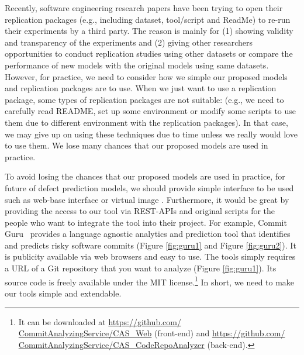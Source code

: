 Recently, software engineering research papers have been trying to open their replication packages (e.g., including dataset, tool/script and ReadMe) to re-run their experiments by a third party.
The reason is mainly for (1) showing validity and transparency of the experiments and (2) giving other researchers opportunities to conduct replication studies using other datasets or compare the performance of new models with the original models using same datasets. However, for practice, we need to consider how we simple our proposed models and replication packages are to use. When we just want to use a replication package, some types of replication packages are not suitable: (e.g., we need to carefully read README, set up some environment or modify some scripts to use them due to different environment with the replication packages). In that case, we may give up on using these techniques due to time unless we really would love to use them. We lose many chances that our proposed models are used in practice.

To avoid losing the chances that our proposed models are used in practice, for future of defect prediction models, we should provide simple interface to be used such as web-base interface or virtual image  .
Furthermore, it would be great by providing the access to our tool via REST-APIs and original scripts for the people who want to integrate the tool into their project. 
For example, Commit Guru~\cite{Rosen2015FSE} provides a language agnostic analytics and prediction tool that identifies and predicts risky software commits (Figure \ref{fig:guru1} and Figure \ref{fig:guru2}).
It is publicity available via web browsers and easy to use. The tools simply requires a URL of a Git repository that you want to analyze (Figure \ref{fig:guru1}).
Its source code is freely available under the MIT license.\footnote{It can be downloaded at \url{https://github.com/
CommitAnalyzingService/CAS_Web} (front-end) and \url{https://github.com/
CommitAnalyzingService/CAS_CodeRepoAnalyzer} (back-end).}
In short, we need to make our tools simple and extendable.


